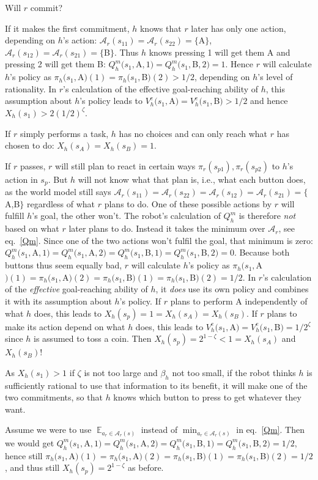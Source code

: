 \documentclass[letterpaper]{article} %
\DeclareMathOperator*{\E}{\mathbb{E}}
\def\A{\mathcal{A}}
\begin{document}
Will $r$ commit? 

If it makes the first commitment, $h$ knows that $r$ later has only one action, depending on $h$'s action: 
$\A_r(s_{11})=\A_r(s_{22})=\{$A$\}$, $\A_r(s_{12})=\A_r(s_{21})=\{$B$\}$.
Thus $h$ knows pressing 1 will get them A and pressing 2 will get them B:
$Q^m_h(s_1,$A$,1)=Q^m_h(s_1,$B$,2)=1$.
Hence $r$ will calculate $h$'s policy as $\pi_h(s_1,$A$)(1)=\pi_h(s_1,$B$)(2)>1/2$, depending on $h$'s level of rationality.
In $r$'s calculation of the effective goal-reaching ability of $h$, this assumption about $h$'s policy leads to $V^e_h(s_1,$A$)=V^e_h(s_1,$B$)>1/2$ and hence $X_h(s_1)>2(1/2)^\zeta$.

If $r$ simply performs a task, $h$ has no choices and can only reach what $r$ has chosen to do: $X_h(s_A)=X_h(s_B)=1$.

If $r$ passes, $r$ will still plan to react in certain ways $\pi_r(s_{p1}),\pi_r(s_{p2})$ to $h$'s action in $s_p$. 
But $h$ will not know what that plan is, i.e., what each button does, as the world model still
says $\A_r(s_{11})=\A_r(s_{22})=\A_r(s_{12})=\A_r(s_{21})=\{$A,B$\}$ regardless of what $r$ plans to do.
One of these possible actions by $r$ will fulfill $h$'s goal, the other won't. 
The robot's calculation of $Q^m_h$ is therefore {\em not} based on what $r$ later plans to do. 
Instead it takes the minimum over $\A_r$, see eq.~\eqref{Qm}.
Since one of the two actions won't fulfil the goal, that minimum is zero: 
$Q^m_h(s_1,$A$,1)=Q^m_h(s_1,$A$,2)=Q^m_h(s_1,$B$,1)=Q^m_h(s_1,$B$,2)=0$.
Because both buttons thus seem equally bad, $r$ will calculate $h$'s policy as $\pi_h(s_1,$A$)(1)=\pi_h(s_1,$A$)(2)=\pi_h(s_1,$B$)(1)=\pi_h(s_1,$B$)(2)=1/2$.
In $r$'s calculation of the {\em effective} goal-reaching ability of $h$, it {\em does} use its own policy and combines it with its assumption about $h$'s policy.
If $r$ plans to perform A independently of what $h$ does,
this leads to $X_h(s_p)=1=X_h(s_A)=X_h(s_B)$.
If $r$ plans to make its action depend on what $h$ does,
this leads to $V^e_h(s_1,$A$)=V^e_h(s_1,$B$)=1/2^\zeta$ since $h$ is assumed to toss a coin.
Then $X_h(s_p)=2^{1-\zeta}<1=X_h(s_A)$ and $X_h(s_B)$!

As $X_h(s_1)>1$ if $\zeta$ is not too large and $\beta_h$ not too small, if the robot thinks $h$ is sufficiently rational to use that information to its benefit, it will make one of the two commitments, so that $h$ knows which button to press to get whatever they want.

Assume we were to use $\E_{a_r\in\A_r(s)}$ instead of $\min_{a_r\in\A_r(s)}$ in eq.~\eqref{Qm}.
Then we would get
$Q^m_h(s_1,$A$,1)=Q^m_h(s_1,$A$,2)=Q^m_h(s_1,$B$,1)=Q^m_h(s_1,$B$,2)=1/2$,
hence still $\pi_h(s_1,$A$)(1)=\pi_h(s_1,$A$)(2)=\pi_h(s_1,$B$)(1)=\pi_h(s_1,$B$)(2)=1/2$,
and thus still $X_h(s_p)=2^{1-\zeta}$ as before.
\end{document}
